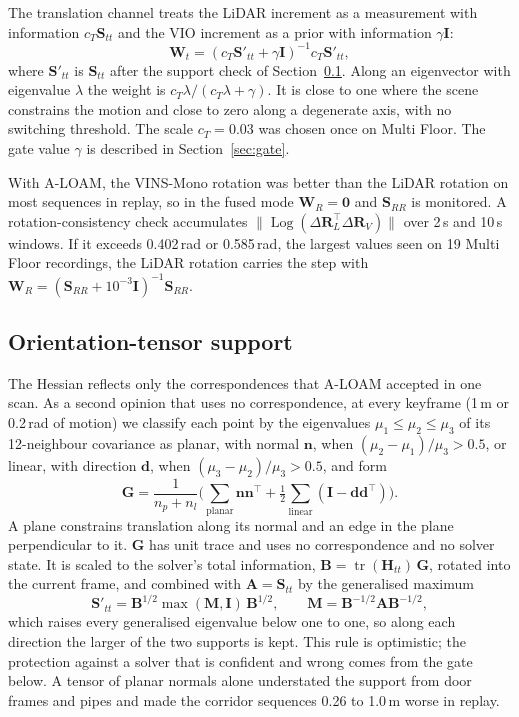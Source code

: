 \documentclass[journal]{IEEEtran}
\newcommand{\Log}{\operatorname{Log}}
\newcommand{\tr}{\operatorname{tr}}
\begin{document}
The translation channel treats the LiDAR increment as a measurement with information $c_T\mathbf S_{tt}$ and the VIO increment as a prior with information $\gamma\mathbf I$:
\begin{equation}
\mathbf W_t=(c_T\mathbf S'_{tt}+\gamma\mathbf I)^{-1}c_T\mathbf S'_{tt}, \label{eq:wt}
\end{equation}
where $\mathbf S'_{tt}$ is $\mathbf S_{tt}$ after the support check of Section~\ref{sec:ot}. Along an eigenvector with eigenvalue $\lambda$ the weight is $c_T\lambda/(c_T\lambda+\gamma)$. It is close to one where the scene constrains the motion and close to zero along a degenerate axis, with no switching threshold. The scale $c_T=0.03$ was chosen once on Multi Floor. The gate value $\gamma$ is described in Section~\ref{sec:gate}.

With A-LOAM, the VINS-Mono rotation was better than the LiDAR rotation on most sequences in replay, so in the fused mode $\mathbf W_R=\mathbf 0$ and $\mathbf S_{RR}$ is monitored. A rotation-consistency check accumulates $\|\Log(\Delta\mathbf R_L^{\top}\Delta\mathbf R_V)\|$ over 2\,s and 10\,s windows. If it exceeds 0.402\,rad or 0.585\,rad, the largest values seen on 19 Multi Floor recordings, the LiDAR rotation carries the step with $\mathbf W_R=(\mathbf S_{RR}+10^{-3}\mathbf I)^{-1}\mathbf S_{RR}$.

\subsection{Orientation-tensor support}\label{sec:ot}
The Hessian reflects only the correspondences that A-LOAM accepted in one scan. As a second opinion that uses no correspondence, at every keyframe (1\,m or 0.2\,rad of motion) we classify each point by the eigenvalues $\mu_1\le\mu_2\le\mu_3$ of its 12-neighbour covariance as planar, with normal $\mathbf n$, when $(\mu_2-\mu_1)/\mu_3>0.5$, or linear, with direction $\mathbf d$, when $(\mu_3-\mu_2)/\mu_3>0.5$, and form
\begin{equation}
\mathbf G=\frac{1}{n_p+n_l}\Big(\sum_{\text{planar}}\mathbf n\mathbf n^{\top}+\tfrac12\sum_{\text{linear}}(\mathbf I-\mathbf d\mathbf d^{\top})\Big).
\end{equation}
A plane constrains translation along its normal and an edge in the plane perpendicular to it. $\mathbf G$ has unit trace and uses no correspondence and no solver state. It is scaled to the solver's total information, $\mathbf B=\tr(\mathbf H_{tt})\,\mathbf G$, rotated into the current frame, and combined with $\mathbf A=\mathbf S_{tt}$ by the generalised maximum
\begin{equation}
\mathbf S'_{tt}=\mathbf B^{1/2}\max(\mathbf M,\mathbf I)\,\mathbf B^{1/2},\qquad \mathbf M=\mathbf B^{-1/2}\mathbf A\mathbf B^{-1/2},
\end{equation}
which raises every generalised eigenvalue below one to one, so along each direction the larger of the two supports is kept. This rule is optimistic; the protection against a solver that is confident and wrong comes from the gate below. A tensor of planar normals alone understated the support from door frames and pipes and made the corridor sequences 0.26 to 1.0\,m worse in replay.
\end{document}
